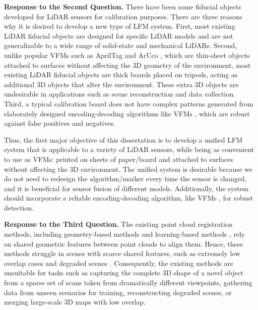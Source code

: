 \noindent\textbf{Response to the Second Question.}
There have been some fiducial objects developed for LiDAR sensors \cite{cal,cal2,a4,lt} for calibration purposes. There are three reasons why it is desired to develop a new type of LFM system. First, most existing LiDAR fiducial objects \cite{cal,cal2,lt,a4} are designed for specific LiDAR models and are not generalizable to a wide range of solid-state and mechanical LiDARs. Second, unlike popular VFMs such as AprilTag \cite{ap3} and ArUco \cite{aruco}, which are thin-sheet objects attached to surfaces without affecting the 3D geometry of the environment, most existing LiDAR fiducial objects \cite{cal,cal2,lt} are thick boards placed on tripods, acting as additional 3D objects that alter the environment. These extra 3D objects are undesirable in applications such as scene reconstruction and data collection. Third, a typical calibration board \cite{cal,cal2,a4} does not have complex patterns generated from elaborately designed encoding-decoding algorithms like VFMs \cite{wang,olson,ap3,aruco,cctag}, which are robust against false positives and negatives. 
\par
Thus, the first major objective of this dissertation is to develop a unified LFM system that is applicable to a variety of LiDAR sensors, while being as convenient to use as VFMs: printed on sheets of paper/board and attached to surfaces without affecting the 3D environment. The unified system is desirable because we do not need to redesign the algorithm/marker every time the sensor is changed, and it is beneficial for sensor fusion of different models. Additionally, the system should incorporate a reliable encoding-decoding algorithm, like VFMs \cite{wang,olson,ap3,aruco,cctag}, for robust detection. 
\par
\noindent\textbf{Response to the Third Question.}
The existing point cloud registration methods, including geometry-based methods \cite{teaser,kiss,lloam,random} and learning-based methods \cite{sghr,pre,mdgd,se3et,geotransformer}, rely on shared geometric features between point clouds to align them.
%
Hence, these methods struggle in scenes with scarce shared features, such as extremely low overlap cases and degraded scenes \cite{degradation}. 
%
Consequently, the existing methods \cite{mdgd,sghr,se3et,geotransformer,teaser} are unsuitable for tasks such as capturing the complete 3D shape of a novel object from a sparse set of scans taken from dramatically different viewpoints, gathering data from unseen scenarios for training, reconstructing degraded scenes, or merging large-scale 3D maps with low overlap.
